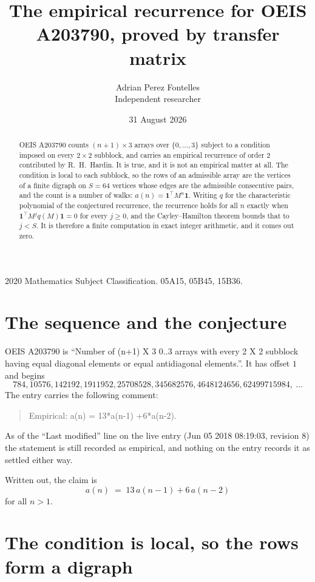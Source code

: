 \documentclass[11pt,a4paper]{article}
\title{The empirical recurrence for OEIS A203790, proved by transfer matrix}
\author{Adrian Perez Fontelles\\ \small Independent researcher}
\date{31 August 2026}
\theoremstyle{plain}
\theoremstyle{definition}
\begin{document}
\maketitle

\begin{abstract}
OEIS A203790 counts $(n+1)\times3$ arrays over $\{0,\dots,3\}$ subject to a condition imposed on
every $2\times2$ subblock, and carries an empirical recurrence of order $2$ contributed
by R.~H.~Hardin. It is true, and it is not an empirical matter at all. The condition is local
to each subblock, so the rows of an admissible array are the vertices of a finite digraph
on $S=64$ vertices whose edges are the admissible consecutive pairs, and the count is a
number of walks: $a(n)=\mathbf{1}^{\!\top}M^{n}\mathbf{1}$. Writing $q$
for the characteristic polynomial of the conjectured recurrence, the recurrence holds for all
$n$ exactly when $\mathbf{1}^{\!\top}M^{j}q(M)\mathbf{1}=0$ for every $j\ge0$, and the
Cayley--Hamilton theorem bounds that to $j<S$. It is therefore a finite computation in exact
integer arithmetic, and it comes out zero.
\end{abstract}

\noindent\small 2020 Mathematics Subject Classification. 05A15, 05B45, 15B36.\normalsize

\section{The sequence and the conjecture}

OEIS A203790 is ``Number of (n+1) X 3 0..3 arrays with every 2 X 2 subblock having equal diagonal elements or equal antidiagonal elements.''. It has offset $1$ and begins
\[
784, 10576, 142192, 1911952, 25708528, 345682576, 4648124656, 62499715984,\ \dots
\]
The entry carries the following comment:
\begin{quote}\small
Empirical: a(n) = 13*a(n-1) +6*a(n-2).
\end{quote}
As of the ``Last modified'' line on the live entry (Jun 05 2018 08:19:03, revision 8) the statement is
still recorded as empirical, and nothing on the entry records it as settled either way.

Written out, the claim is
\begin{equation}\label{eq:conj}
a(n)\;=\;13\,a(n-1) + 6\,a(n-2)
\end{equation}
for all $n>1$.

\section{The condition is local, so the rows form a digraph}
\end{document}
